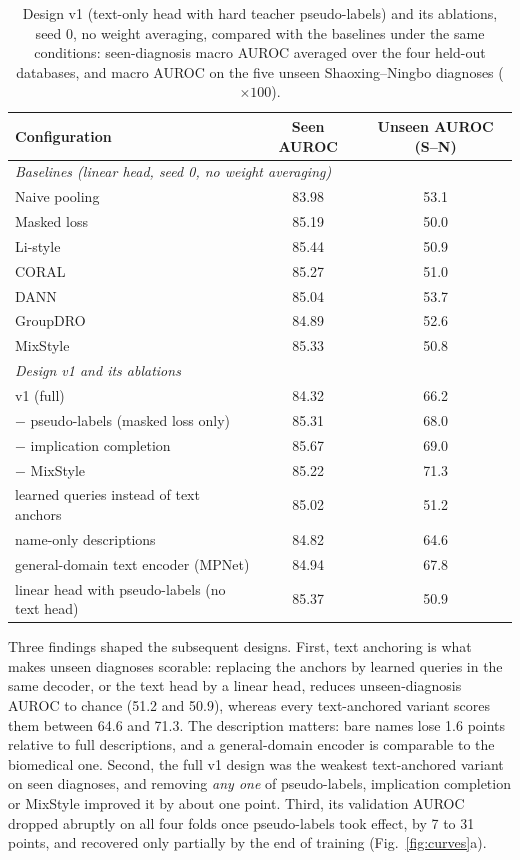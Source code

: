 \begin{table}[!htbp]
\centering\footnotesize
\caption{Design v1 (text-only head with hard teacher pseudo-labels) and its ablations, seed 0, no weight averaging, compared with the baselines under the same conditions: seen-diagnosis macro AUROC averaged over the four held-out databases, and macro AUROC on the five unseen Shaoxing--Ningbo diagnoses ($\times100$).}\label{tab:v1}
\begin{tabular}{lcc}
\toprule
Configuration & Seen AUROC & Unseen AUROC (S--N) \\
\midrule
\multicolumn{3}{l}{\emph{Baselines (linear head, seed 0, no weight averaging)}} \\
Naive pooling & 83.98 & 53.1 \\
Masked loss & 85.19 & 50.0 \\
Li-style & 85.44 & 50.9 \\
CORAL & 85.27 & 51.0 \\
DANN & 85.04 & 53.7 \\
GroupDRO & 84.89 & 52.6 \\
MixStyle & 85.33 & 50.8 \\
\midrule
\multicolumn{3}{l}{\emph{Design v1 and its ablations}} \\
v1 (full) & 84.32 & 66.2 \\
$-$ pseudo-labels (masked loss only) & 85.31 & 68.0 \\
$-$ implication completion & 85.67 & 69.0 \\
$-$ MixStyle & 85.22 & 71.3 \\
learned queries instead of text anchors & 85.02 & 51.2 \\
name-only descriptions & 84.82 & 64.6 \\
general-domain text encoder (MPNet) & 84.94 & 67.8 \\
linear head with pseudo-labels (no text head) & 85.37 & 50.9 \\
\bottomrule
\end{tabular}
\end{table}

Three findings shaped the subsequent designs. First, text anchoring is what makes unseen diagnoses scorable: replacing the anchors by learned queries in the same decoder, or the text head by a linear head, reduces unseen-diagnosis AUROC to chance (51.2 and 50.9), whereas every text-anchored variant scores them between 64.6 and 71.3. The description matters: bare names lose 1.6 points relative to full descriptions, and a general-domain encoder is comparable to the biomedical one. Second, the full v1 design was the weakest text-anchored variant on seen diagnoses, and removing \emph{any one} of pseudo-labels, implication completion or MixStyle improved it by about one point. Third, its validation AUROC dropped abruptly on all four folds once pseudo-labels took effect, by 7 to 31 points, and recovered only partially by the end of training (Fig.~\ref{fig:curves}a).

